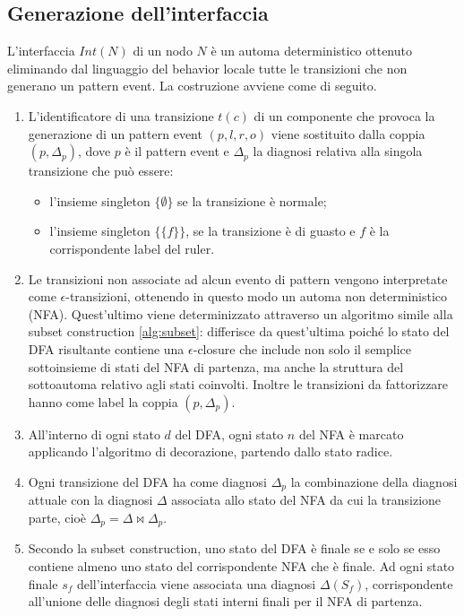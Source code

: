 \subsection{Generazione dell'interfaccia}
L'interfaccia $Int(N)$ di un nodo $N$ è un automa deterministico ottenuto eliminando dal linguaggio del behavior locale tutte le transizioni che non generano un pattern event.
La costruzione avviene come di seguito.
\begin{enumerate}
\item L'identificatore di una transizione $t(c)$ di un componente che provoca la generazione di un pattern event $(p,l,r,o)$ viene sostituito dalla coppia $(p,\Delta_p)$, dove $p$ è il pattern event e $\Delta_p$ la diagnosi relativa alla singola transizione che può essere:
\begin{itemize}
\item l'insieme singleton $\{\emptyset\}$ se la transizione è normale;
\item l'insieme singleton $\{\{f\}\}$, se la transizione è di guasto e $f$ è la corrispondente label del ruler.
\end{itemize}
\item Le transizioni non associate ad alcun evento di pattern vengono interpretate come $\epsilon$-transizioni, ottenendo in questo modo un automa non deterministico (NFA). Quest'ultimo viene determinizzato attraverso un algoritmo simile alla subset construction \ref{alg:subset}: differisce da quest'ultima poiché lo stato del DFA risultante contiene una $\epsilon$-closure che include non solo il semplice sottoinsieme di stati del NFA di partenza, ma anche la struttura del sottoautoma relativo agli stati coinvolti. Inoltre le transizioni da fattorizzare hanno come label la coppia $(p,\Delta_p)$.
\item All'interno di ogni stato $d$ del DFA, ogni stato $n$ del NFA è marcato applicando l'algoritmo di decorazione, partendo dallo stato radice.
\item Ogni transizione del DFA ha come diagnosi $\Delta_p$ la combinazione della diagnosi attuale con la diagnosi $\Delta$ associata allo stato del NFA da cui la transizione parte, cioè $\Delta_p = \Delta \Join \Delta_p$.
\item Secondo la subset construction, uno stato del DFA è finale se e solo se esso contiene almeno uno stato del corrispondente NFA che è finale. Ad ogni stato finale $s_f$ dell'interfaccia viene associata una diagnosi  $\Delta(S_f)$, corrispondente all'unione delle diagnosi degli stati interni finali per il NFA di partenza.
\end{enumerate}

